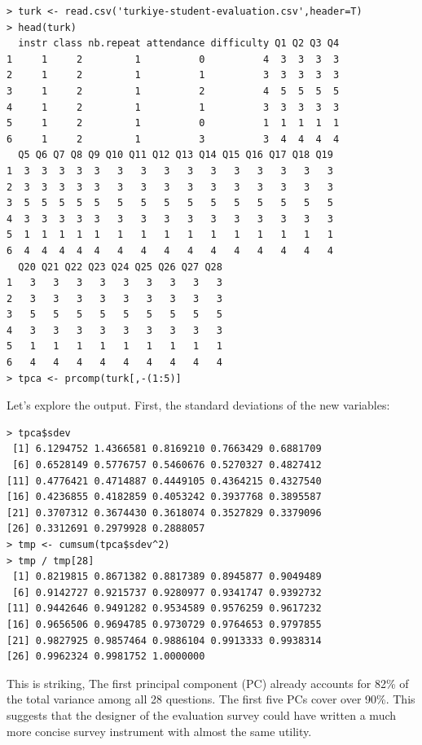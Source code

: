 \begin{lstlisting}
> turk <- read.csv('turkiye-student-evaluation.csv',header=T)
> head(turk)
  instr class nb.repeat attendance difficulty Q1 Q2 Q3 Q4
1     1     2         1          0          4  3  3  3  3
2     1     2         1          1          3  3  3  3  3
3     1     2         1          2          4  5  5  5  5
4     1     2         1          1          3  3  3  3  3
5     1     2         1          0          1  1  1  1  1
6     1     2         1          3          3  4  4  4  4
  Q5 Q6 Q7 Q8 Q9 Q10 Q11 Q12 Q13 Q14 Q15 Q16 Q17 Q18 Q19
1  3  3  3  3  3   3   3   3   3   3   3   3   3   3   3
2  3  3  3  3  3   3   3   3   3   3   3   3   3   3   3
3  5  5  5  5  5   5   5   5   5   5   5   5   5   5   5
4  3  3  3  3  3   3   3   3   3   3   3   3   3   3   3
5  1  1  1  1  1   1   1   1   1   1   1   1   1   1   1
6  4  4  4  4  4   4   4   4   4   4   4   4   4   4   4
  Q20 Q21 Q22 Q23 Q24 Q25 Q26 Q27 Q28
1   3   3   3   3   3   3   3   3   3
2   3   3   3   3   3   3   3   3   3
3   5   5   5   5   5   5   5   5   5
4   3   3   3   3   3   3   3   3   3
5   1   1   1   1   1   1   1   1   1
6   4   4   4   4   4   4   4   4   4
> tpca <- prcomp(turk[,-(1:5)]
\end{lstlisting}

Let's explore the output.  First, the standard deviations of the new
variables:

\begin{lstlisting}
> tpca$sdev
 [1] 6.1294752 1.4366581 0.8169210 0.7663429 0.6881709
 [6] 0.6528149 0.5776757 0.5460676 0.5270327 0.4827412
[11] 0.4776421 0.4714887 0.4449105 0.4364215 0.4327540
[16] 0.4236855 0.4182859 0.4053242 0.3937768 0.3895587
[21] 0.3707312 0.3674430 0.3618074 0.3527829 0.3379096
[26] 0.3312691 0.2979928 0.2888057
> tmp <- cumsum(tpca$sdev^2)
> tmp / tmp[28]
 [1] 0.8219815 0.8671382 0.8817389 0.8945877 0.9049489
 [6] 0.9142727 0.9215737 0.9280977 0.9341747 0.9392732
[11] 0.9442646 0.9491282 0.9534589 0.9576259 0.9617232
[16] 0.9656506 0.9694785 0.9730729 0.9764653 0.9797855
[21] 0.9827925 0.9857464 0.9886104 0.9913333 0.9938314
[26] 0.9962324 0.9981752 1.0000000
\end{lstlisting}

This is striking,  The first principal component (PC) already accounts
for 82\% of the total variance among all 28 questions.  The first five
PCs cover over 90\%.  This suggests that the designer of the evaluation
survey could have written a much more concise survey instrument with
almost the same utility.

